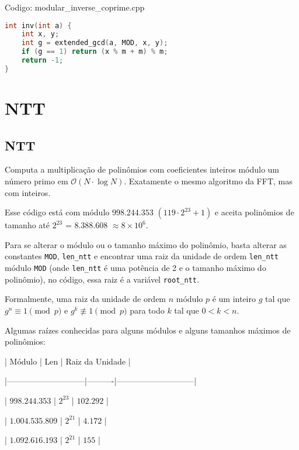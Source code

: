 \documentclass[10pt, a4paper, oneside]{book}
\begin{document}
Codigo: modular\_inverse\_coprime.cpp

\begin{lstlisting}[language=C++]
int inv(int a) {
    int x, y;
    int g = extended_gcd(a, MOD, x, y);
    if (g == 1) return (x % m + m) % m;
    return -1;
}
\end{lstlisting}
\hfill

\section{NTT}
\subsection{NTT}


Computa a multiplicação de polinômios com coeficientes inteiros módulo um número primo em $\mathcal{O}(N \cdot \log N)$. Exatamente o mesmo algoritmo da FFT, mas com inteiros.



Esse código está com módulo $998.244.353$ $(119 \cdot 2^{23} + 1)$ e aceita polinômios de tamanho até $2^{23}$ = $8.388.608$ $\approx 8 \times 10^6$.



Para se alterar o módulo ou o tamanho máximo do polinômio, basta alterar as constantes \texttt{MOD}, \texttt{len\_ntt} e encontrar uma raiz da unidade de ordem \texttt{len\_ntt} módulo \texttt{MOD} (onde \texttt{len\_ntt} é uma potência de 2 e o tamanho máximo do polinômio), no código, essa raiz é a variável \texttt{root\_ntt}.



Formalmente, uma raiz da unidade de ordem $n$ módulo $p$ é um inteiro $g$ tal que $g^n \equiv 1 \pmod{p}$ e $g^k \not\equiv 1 \pmod{p}$ para todo $k$ tal que $0 < k < n$.



Algumas raízes conhecidas para alguns módulos e alguns tamanhos máximos de polinômios:



|           Módulo            |   Len    |       Raiz da Unidade       |

|-----------------------------|----------|-----------------------------|

|        $998.244.353$        | $2^{23}$ |          $102.292$          |

|       $1.004.535.809$       | $2^{21}$ |           $4.172$           |

|       $1.092.616.193$       | $2^{21}$ |            $155$            |
\end{document}
